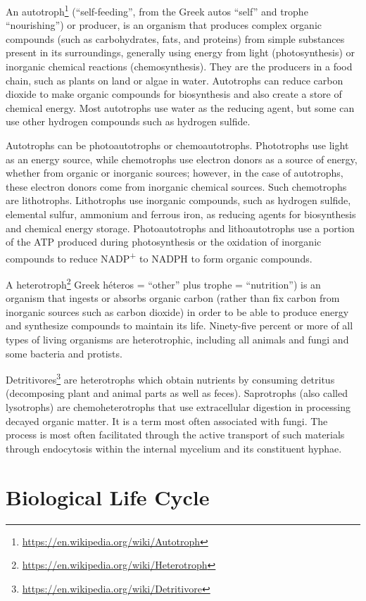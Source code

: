 \documentclass[]{book}
\let\rmarkdownfootnote\footnote%
\def\footnote{\protect\rmarkdownfootnote}
\renewcommand{\href}[2]{#2\footnote{\url{#1}}}
\theoremstyle{definition}
\theoremstyle{definition}
\theoremstyle{definition}
\theoremstyle{remark}
\begin{document}
An \href{https://en.wikipedia.org/wiki/Autotroph}{autotroph}
(``self-feeding'', from the Greek autos ``self'' and trophe
``nourishing'') or producer, is an organism that produces complex
organic compounds (such as carbohydrates, fats, and proteins) from
simple substances present in its surroundings, generally using energy
from light (photosynthesis) or inorganic chemical reactions
(chemosynthesis). They are the producers in a food chain, such as plants
on land or algae in water. Autotrophs can reduce carbon dioxide to make
organic compounds for biosynthesis and also create a store of chemical
energy. Most autotrophs use water as the reducing agent, but some can
use other hydrogen compounds such as hydrogen sulfide.

Autotrophs can be photoautotrophs or chemoautotrophs. Phototrophs use
light as an energy source, while chemotrophs use electron donors as a
source of energy, whether from organic or inorganic sources; however, in
the case of autotrophs, these electron donors come from inorganic
chemical sources. Such chemotrophs are lithotrophs. Lithotrophs use
inorganic compounds, such as hydrogen sulfide, elemental sulfur,
ammonium and ferrous iron, as reducing agents for biosynthesis and
chemical energy storage. Photoautotrophs and lithoautotrophs use a
portion of the ATP produced during photosynthesis or the oxidation of
inorganic compounds to reduce NADP\textsuperscript{+} to NADPH to form organic compounds.

A \href{https://en.wikipedia.org/wiki/Heterotroph}{heterotroph} Greek
héteros = ``other'' plus trophe = ``nutrition'') is an organism that
ingests or absorbs organic carbon (rather than fix carbon from inorganic
sources such as carbon dioxide) in order to be able to produce energy
and synthesize compounds to maintain its life. Ninety-five percent or
more of all types of living organisms are heterotrophic, including all
animals and fungi and some bacteria and protists.

\href{https://en.wikipedia.org/wiki/Detritivore}{Detritivores} are
heterotrophs which obtain nutrients by consuming detritus (decomposing
plant and animal parts as well as feces). Saprotrophs (also called
lysotrophs) are chemoheterotrophs that use extracellular digestion in
processing decayed organic matter. It is a term most often associated
with fungi. The process is most often facilitated through the active
transport of such materials through endocytosis within the internal
mycelium and its constituent hyphae. 

\section{Biological Life Cycle}\label{biological-life-cycle}
\end{document}
